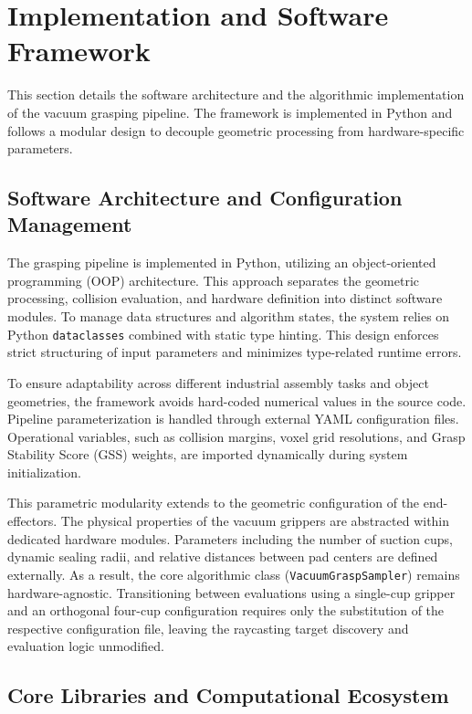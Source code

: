 \section{Implementation and Software Framework}

This section details the software architecture and the algorithmic implementation of the vacuum grasping pipeline. The framework is implemented in Python and follows a modular design to decouple geometric processing from hardware-specific parameters.

\subsection{Software Architecture and Configuration Management}

The grasping pipeline is implemented in Python, utilizing an object-oriented programming (OOP) architecture. This approach separates the geometric processing, collision evaluation, and hardware definition into distinct software modules. To manage data structures and algorithm states, the system relies on Python \texttt{dataclasses} combined with static type hinting. This design enforces strict structuring of input parameters and minimizes type-related runtime errors.


To ensure adaptability across different industrial assembly tasks and object geometries, the framework avoids hard-coded numerical values in the source code. Pipeline parameterization is handled through external YAML configuration files. Operational variables, such as collision margins, voxel grid resolutions, and Grasp Stability Score (GSS) weights, are imported dynamically during system initialization.

This parametric modularity extends to the geometric configuration of the end-effectors. The physical properties of the vacuum grippers are abstracted within dedicated hardware modules. Parameters including the number of suction cups, dynamic sealing radii, and relative distances between pad centers are defined externally. As a result, the core algorithmic class (\texttt{VacuumGraspSampler}) remains hardware-agnostic. Transitioning between evaluations using a single-cup gripper and an orthogonal four-cup configuration requires only the substitution of the respective configuration file, leaving the raycasting target discovery and evaluation logic unmodified.

\subsection{Core Libraries and Computational Ecosystem}


